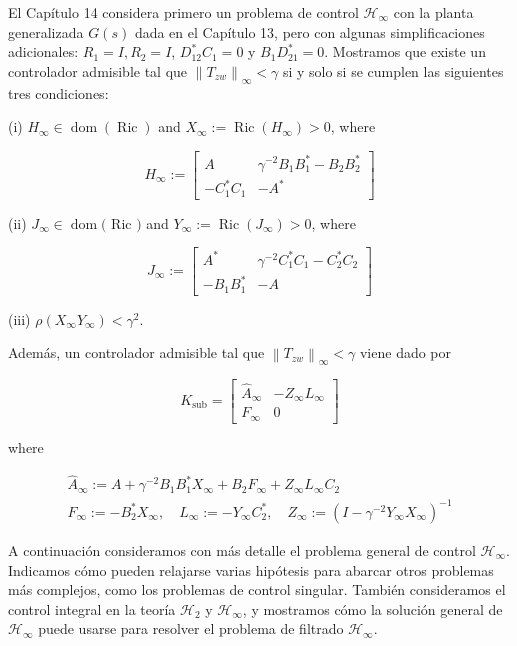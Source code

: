 \documentclass[11pt]{article}
\begin{document}
El Capítulo 14 considera primero un problema de control $\mathcal{H}_{\infty}$ con la planta generalizada $G(s)$ dada en el Capítulo 13, pero con algunas simplificaciones adicionales: $R_{1}=I, R_{2}=I$, $D_{12}^{*} C_{1}=0$ y $B_{1} D_{21}^{*}=0$. Mostramos que existe un controlador admisible tal que $\left\|T_{z w}\right\|_{\infty}<\gamma$ si y solo si se cumplen las siguientes tres condiciones:

(i) $H_{\infty} \in \operatorname{dom}(\operatorname{Ric})$ and $X_{\infty}:=\operatorname{Ric}\left(H_{\infty}\right)>0$, where

$$
H_{\infty}:=\left[\begin{array}{cc}
A & \gamma^{-2} B_{1} B_{1}^{*}-B_{2} B_{2}^{*} \\
-C_{1}^{*} C_{1} & -A^{*}
\end{array}\right]
$$

(ii) $J_{\infty} \in \operatorname{dom}($ Ric $)$ and $Y_{\infty}:=\operatorname{Ric}\left(J_{\infty}\right)>0$, where

$$
J_{\infty}:=\left[\begin{array}{cc}
A^{*} & \gamma^{-2} C_{1}^{*} C_{1}-C_{2}^{*} C_{2} \\
-B_{1} B_{1}^{*} & -A
\end{array}\right]
$$

(iii) $\rho\left(X_{\infty} Y_{\infty}\right)<\gamma^{2}$.

Además, un controlador admisible tal que $\left\|T_{z w}\right\|_{\infty}<\gamma$ viene dado por

$$
K_{\mathrm{sub}}=\left[\begin{array}{c|c}
\hat{A}_{\infty} & -Z_{\infty} L_{\infty} \\
\hline F_{\infty} & 0
\end{array}\right]
$$

where

$$
\begin{gathered}
\hat{A}_{\infty}:=A+\gamma^{-2} B_{1} B_{1}^{*} X_{\infty}+B_{2} F_{\infty}+Z_{\infty} L_{\infty} C_{2} \\
F_{\infty}:=-B_{2}^{*} X_{\infty}, \quad L_{\infty}:=-Y_{\infty} C_{2}^{*}, \quad Z_{\infty}:=\left(I-\gamma^{-2} Y_{\infty} X_{\infty}\right)^{-1}
\end{gathered}
$$

A continuación consideramos con más detalle el problema general de control $\mathcal{H}_{\infty}$. Indicamos cómo pueden relajarse varias hipótesis para abarcar otros problemas más complejos, como los problemas de control singular. También consideramos el control integral en la teoría $\mathcal{H}_{2}$ y $\mathcal{H}_{\infty}$, y mostramos cómo la solución general de $\mathcal{H}_{\infty}$ puede usarse para resolver el problema de filtrado $\mathcal{H}_{\infty}$.
\end{document}

